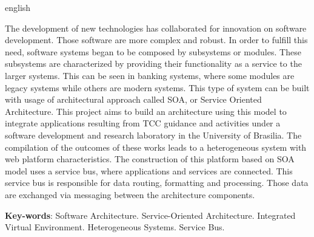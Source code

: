 \begin{resumo}[Abstract]
 \begin{otherlanguage*}{english}

The development of new technologies has collaborated for innovation on software development. Those software are more complex and robust. In order to fulfill this need, software systems began to be composed by subsystems or modules. These subsystems are characterized by providing their functionality as a service to the larger systems. This can be seen in banking systems, where some modules are legacy systems while others are modern systems. This type of system can be built with usage of architectural approach called SOA, or Service Oriented Architecture. This project aims to build an architecture using this model to integrate applications resulting from TCC guidance and activities under a software development and research laboratory in the University of Brasilia. The compilation of the outcomes of these works leads to a heterogeneous system with web platform characteristics. The construction of this platform based on SOA model uses a service bus, where applications and services are connected. This service bus is responsible for data routing, formatting and processing. Those data are exchanged via messaging between the architecture components.

   \vspace{\onelineskip}
 
   \noindent 
   \textbf{Key-words}: Software Architecture. Service-Oriented Architecture. Integrated Virtual Environment. Heterogeneous Systems. Service Bus.
 \end{otherlanguage*}
\end{resumo}
